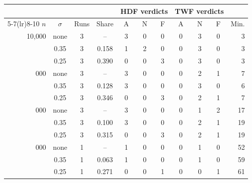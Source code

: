 \begin{tabular}{@{}rcccccccccr@{}}
\toprule
& & & & \multicolumn{3}{c}{HDF verdicts} & \multicolumn{3}{c}{TWF verdicts} & \\
\cmidrule(lr){5-7}\cmidrule(lr){8-10}
$n$ & $\sigma$ & Runs & Share & A & N & F & A & N & F & Min. \\
\midrule
10{,}000 & none & 3 & -- & 3 & 0 & 0 & 0 & 3 & 0 & 3 \\
 & 0.35 & 3 & 0.158 & 1 & 2 & 0 & 0 & 3 & 0 & 3 \\
 & 0.25 & 3 & 0.390 & 0 & 0 & 3 & 0 & 3 & 0 & 3 \\
\addlinespace
30{,}000 & none & 3 & -- & 3 & 0 & 0 & 0 & 2 & 1 & 7 \\
 & 0.35 & 3 & 0.128 & 3 & 0 & 0 & 0 & 3 & 0 & 6 \\
 & 0.25 & 3 & 0.346 & 0 & 0 & 3 & 0 & 2 & 1 & 7 \\
\addlinespace
100{,}000 & none & 3 & -- & 3 & 0 & 0 & 0 & 1 & 2 & 17 \\
 & 0.35 & 3 & 0.100 & 3 & 0 & 0 & 0 & 2 & 1 & 19 \\
 & 0.25 & 3 & 0.315 & 0 & 0 & 3 & 0 & 2 & 1 & 19 \\
\addlinespace
300{,}000 & none & 1 & -- & 1 & 0 & 0 & 0 & 1 & 0 & 52 \\
 & 0.35 & 1 & 0.063 & 1 & 0 & 0 & 0 & 1 & 0 & 59 \\
 & 0.25 & 1 & 0.271 & 0 & 0 & 1 & 0 & 0 & 1 & 61 \\
\bottomrule
\end{tabular}
